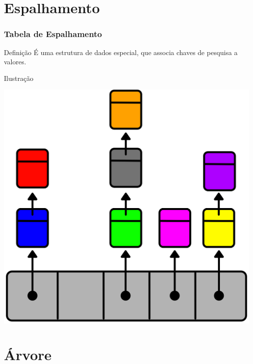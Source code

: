 \documentclass{beamer}
\begin{document}
\section{Espalhamento}

\begin{frame}
\frametitle{Tabela de Espalhamento}

\begin{block}{Definição}
É uma estrutura de dados especial, que associa chaves de pesquisa a valores.
\end{block}\vfill

\begin{exampleblock}{Ilustração}
	\begin{center}
		\includegraphics[scale=0.37]{img/espalhamento.png}
	\end{center}
\end{exampleblock}
\end{frame}

\section{Árvore}
\end{document}
